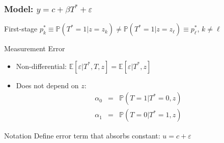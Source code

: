 \documentclass{beamer}
\begin{document}
\begin{frame}
  \frametitle{Model: $y = c + \beta T^* + \varepsilon$}
  \begin{block}{First-stage}
    $p^*_k \equiv \mathbb{P}(T^*=1|z=z_k) \neq \mathbb{P}(T^*=1|z=z_\ell)\equiv p_\ell^*$, $k\neq \ell$
  \end{block}
  \begin{block}{Measurement Error}
    \begin{itemize}
      \item Non-differential: $\mathbb{E}[\varepsilon|T^*,T,z] =  \mathbb{E}[\varepsilon|T^*,z]$
      \item Does not depend on $z$:
\begin{eqnarray*}
 \alpha_0&=&  \mathbb{P}(T = 1| T^* = 0, z)  \\ 
 \alpha_1&=& \mathbb{P}(T = 0| T^* = 1, z) 
\end{eqnarray*}
    \end{itemize}
  \end{block}

  \begin{alertblock}{Notation}
  Define error term that absorbs constant: $u = c + \varepsilon$ 
  \end{alertblock}
\end{frame}
\end{document}
